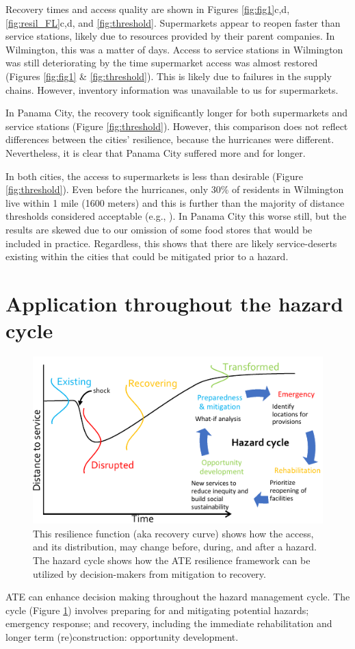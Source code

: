 \documentclass[9pt,twocolumn,twoside,lineno]{pnas-new}
\begin{document}
Recovery times and access quality are shown in Figures \ref{fig:fig1}c,d, \ref{fig:resil_FL}c,d, and \ref{fig:threshold}. 
Supermarkets appear to reopen faster than service stations, likely due to resources provided by their parent companies.
In Wilmington, this was a matter of days.
Access to service stations in Wilmington was still deteriorating by the time supermarket access was almost restored (Figures \ref{fig:fig1} \& \ref{fig:threshold}).
This is likely due to failures in the supply chains.
However, inventory information was unavailable to us for supermarkets.

In Panama City, the recovery took significantly longer for both supermarkets and service stations (Figure \ref{fig:threshold}).
However, this comparison does not reflect differences between the cities' resilience, because the hurricanes were different. 
Nevertheless, it is clear that Panama City suffered more and for longer.

In both cities, the access to supermarkets is less than desirable (Figure \ref{fig:threshold}).
Even before the hurricanes, only 30\% of residents in Wilmington live within 1 mile (1600 meters) and this is further than the majority of distance thresholds considered acceptable (e.g., \cite{Talen2003-dc}).
In Panama City this worse still, but the results are skewed due to our omission of some food stores that would be included in practice.
Regardless, this shows that there are likely service-deserts existing within the cities that could be mitigated prior to a hazard.

\section*{Application throughout the hazard cycle}
\begin{figure}
    \centering
    \includegraphics[width=\linewidth]{report/fig/Figure_hazardCycle.pdf}
    \caption{This resilience function (aka recovery curve) shows how the access, and its distribution, may change before, during, and after a hazard. The hazard cycle shows how the ATE resilience framework can be utilized by decision-makers from mitigation to recovery.}
    \label{fig:haz_cycle}
\end{figure}
ATE can enhance decision making throughout the hazard management cycle. 
The cycle (Figure \ref{fig:haz_cycle}) involves preparing for and mitigating potential hazards; emergency response; and recovery, including the immediate rehabilitation and longer term (re)construction: opportunity development.
\end{document}
